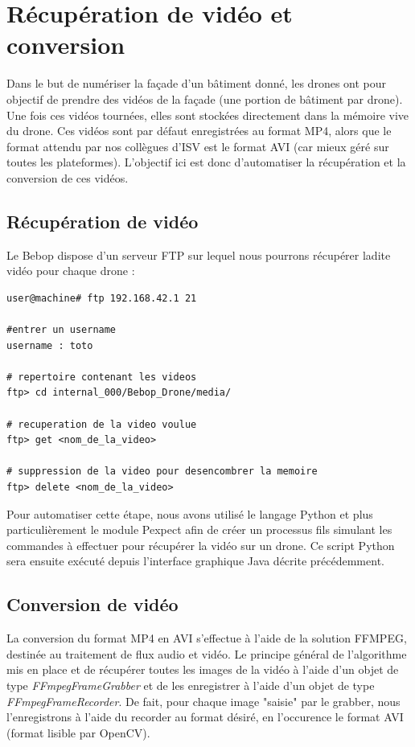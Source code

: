 \documentclass[12pt, openany]{report}
\begin{document}
\section{Récupération de vidéo et conversion}
Dans le but de numériser la façade d'un bâtiment donné, les drones ont pour objectif de prendre des vidéos de la façade (une portion de bâtiment par drone). Une fois ces vidéos tournées, elles sont stockées directement dans la mémoire vive du drone. Ces vidéos sont par défaut enregistrées au format MP4, alors que le format attendu par nos collègues d'ISV est le format AVI (car mieux géré sur toutes les plateformes). L'objectif ici est donc d'automatiser la récupération et la conversion de ces vidéos. 


\subsection{Récupération de vidéo}
Le Bebop dispose d'un serveur FTP sur lequel nous pourrons récupérer ladite vidéo pour chaque drone :
\begin{lstlisting}[frame=single]
user@machine# ftp 192.168.42.1 21

#entrer un username
username : toto

# repertoire contenant les videos
ftp> cd internal_000/Bebop_Drone/media/	

# recuperation de la video voulue
ftp> get <nom_de_la_video>			

# suppression de la video pour desencombrer la memoire
ftp> delete <nom_de_la_video>				
\end{lstlisting}

Pour automatiser cette étape, nous avons utilisé le langage Python et plus particulièrement le module Pexpect afin de créer un processus fils simulant les commandes à effectuer pour récupérer la vidéo sur un drone. Ce script Python sera ensuite exécuté depuis l'interface graphique Java décrite précédemment.


\subsection{Conversion de vidéo}
La conversion du format MP4 en AVI s'effectue à l'aide de la solution FFMPEG, destinée au traitement de flux audio et vidéo. Le principe général de l'algorithme mis en place et de récupérer toutes les images de la vidéo à l'aide d'un objet de type \textit{FFmpegFrameGrabber} et de les enregistrer à l'aide d'un objet de type \textit{FFmpegFrameRecorder}. De fait, pour chaque image "saisie" par le grabber, nous l'enregistrons à l'aide du recorder au format désiré, en l'occurence le format AVI (format lisible par OpenCV).
\end{document}
